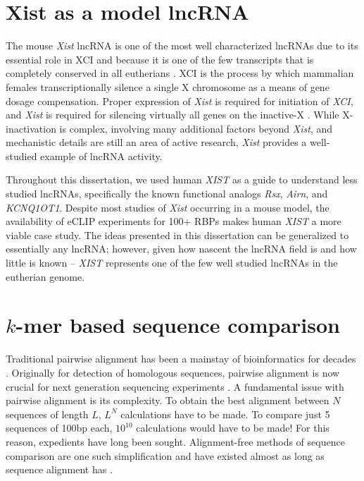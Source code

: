 \section{Xist as a model lncRNA}
The mouse \textit{Xist} lncRNA is one of the most well characterized lncRNAs due to its essential role in XCI and because it is one of the few transcripts that is completely conserved in all eutherians \cite{Brown10TheNucleus.,Brockdorff10TheNucleus.,Sprague2019NonlinearDomains,Kirk2018FunctionalContent}. XCI is the process by which mammalian females transcriptionally silence a single X chromosome as a means of gene dosage compensation. Proper expression of \textit{Xist} is required for initiation of \textit{XCI}, and \textit{Xist} is required for silencing virtually all genes on the inactive-X \cite{Brown10TheNucleus.,Brockdorff10TheNucleus.,Hoki2009AMouse}. While X-inactivation is complex, involving many additional factors beyond \textit{Xist}, and mechanistic details are still an area of active research, \textit{Xist} provides a well-studied example of lncRNA activity.


Throughout this dissertation, we used human \textit{XIST} as a guide to understand less studied lncRNAs, specifically the known functional analogs \emph{Rsx}, \emph{Airn}, and \emph{KCNQ1OT1}. Despite most studies of \textit{Xist} occurring in a mouse model, the availability of eCLIP experiments for 100+ RBPs makes human \textit{XIST} a more viable case study.  The ideas presented in this dissertation can be generalized to essentially any lncRNA; however, given how nascent the lncRNA field is and how little is known -- \emph{XIST} represents one of the few well studied lncRNAs in the eutherian genome.

\section{$k$-mer based sequence comparison}
Traditional pairwise alignment has been a mainstay of bioinformatics for decades \cite{Smith1981IdentificationSubsequences}. Originally for detection of homologous sequences, pairwise alignment is now crucial for next generation sequencing experiments \cite{Dobin2013STAR:Aligner,Langmead2009UltrafastGenome}. A fundamental issue with pairwise alignment is its complexity. To obtain the best alignment between $N$ sequences of length $L$, $L^N$ calculations have to be made. To compare just 5 sequences of 100bp each, $10^{10}$ calculations would have to be made! For this reason, expedients have long been sought. Alignment-free methods of sequence comparison are one such simplification and have existed almost as long as sequence alignment has \cite{Haubold2014Alignment-freeGenetics,Vinga2003Alignment-freeReview}.

